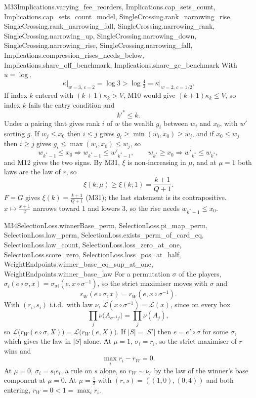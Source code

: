 \begin{mproof}{M33}{Implications.varying_fee_reorders, Implications.cap_sets_count, Implications.cap_sets_count_model, SingleCrossing.rank_narrowing_rise, SingleCrossing.rank_narrowing_fall, SingleCrossing.narrowing_rank, SingleCrossing.narrowing_up, SingleCrossing.narrowing_down, SingleCrossing.narrowing_rise, SingleCrossing.narrowing_fall, Implications.compression_rises_needs_below, Implications.share_off_benchmark, Implications.share_ge_benchmark}
With $u=\log$,
\[
  \kappa\big|_{w=3,\,c=2}=\log3>\log\tfrac43=\kappa\big|_{w=2,\,c=1/2}.
\]
If index $k$ entered with $(k+1)\kappa_k>V$, M10 would give
$(k+1)\kappa_k\le V$, so index $k$ fails the entry condition and
\[
  k'^*\le k .
\]
Under a pairing that gives rank $i$ of $w$ the wealth $g_i$ between $w_i$ and $x_0$, with $w'$ sorting
$g$. If $w_j\le x_0$ then $i\le j$ gives $g_i\ge\min(w_i,x_0)\ge w_j$, and if
$x_0\le w_j$ then $i\ge j$ gives $g_i\le\max(w_i,x_0)\le w_j$, so
\[
  w_{k^*-1}\le x_0\Rightarrow w_{k^*-1}\le w'_{k^*-1},\qquad
  w_{k^*}\ge x_0\Rightarrow w'_{k^*}\le w_{k^*},
\]
and M12 gives the two signs. By M31, $\xi$ is non-increasing in $\mu$, and at
$\mu=1$ both laws are the law of $r$, so
\[
  \xi(k;\mu)\ge\xi(k;1)=\frac{k+1}{Q+1}.
\]
$F=G$ gives $\xi(k)=\frac{k+1}{Q+1}$ (M31); the last statement is its
contrapositive. $x\mapsto\frac{x+1}{2}$ narrows toward $1$ and lowers $3$,
so the rise needs $w_{k^*-1}\le x_0$.
\end{mproof}

\begin{mproof}{M34}{SelectionLoss.winnerBase_perm, SelectionLoss.pi_map_perm, SelectionLoss.law_perm, SelectionLoss.exists_perm_of_card_eq, SelectionLoss.law_count, SelectionLoss.loss_zero_at_one, SelectionLoss.score_zero, SelectionLoss.loss_pos_at_half, WeightEndpoints.winner_base_eq_sup_at_one, WeightEndpoints.winner_base_law}
For a permutation $\sigma$ of the players,
$\sigma_i(e\circ\sigma,x)=\sigma_{\sigma i}(e,x\circ\sigma^{-1})$, so the strict
maximiser moves with $\sigma$ and
\[
  r_W(e\circ\sigma,x)=r_W(e,x\circ\sigma^{-1}).
\]
With $(r_i,s_i)$ i.i.d.\ with law $\nu$, $\mathcal L(x\circ\sigma^{-1})=\mathcal L(x)$,
since on every box
\[
  \prod_j\nu\big(A_{\sigma^{-1}j}\big)=\prod_j\nu(A_j),
\]
so $\mathcal L\big(r_W(e\circ\sigma,X)\big)=\mathcal L\big(r_W(e,X)\big)$. If
$|S|=|S'|$ then $e=e'\circ\sigma$ for some $\sigma$, which gives the law in
$|S|$ alone. At $\mu=1$, $\sigma_i=r_i$, so the strict maximiser of $r$ wins and
\[
  \max_i r_i-r_W=0 .
\]
At $\mu=0$, $\sigma_i=s_ie_i$, a rule on $s$ alone, so $r_W\sim\nu_r$ by the law
of the winner's base component at $\mu=0$. At $\mu=\tfrac12$ with
$(r,s)=((1,0),(0,4))$ and both entering, $r_W=0<1=\max_i r_i$.
\end{mproof}




